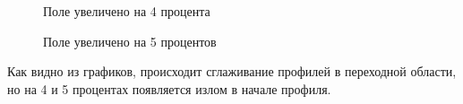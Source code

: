 \documentclass[a4paper]{article}
\begin{document}
\begin{figure}[h!]
\caption{Поле увеличено на 4 процента}
\end{figure}
\begin{figure}[h!]
\caption{Поле увеличено на 5 процентов}
\end{figure}
\hfill\break
\hfill\break
\hfill\break
\hfill\break
\hfill\break
\hfill\break
\hfill\break
\hfill\break
\hfill\break
\hfill\break
\hfill\break
\hfill\break
\hfill\break
\hfill\break
\hfill\break
\hfill\break
Как видно из графиков, происходит сглаживание профилей в переходной области, но на 4 и 5 процентах появляется излом в начале профиля.
\newpage
\end{document}
